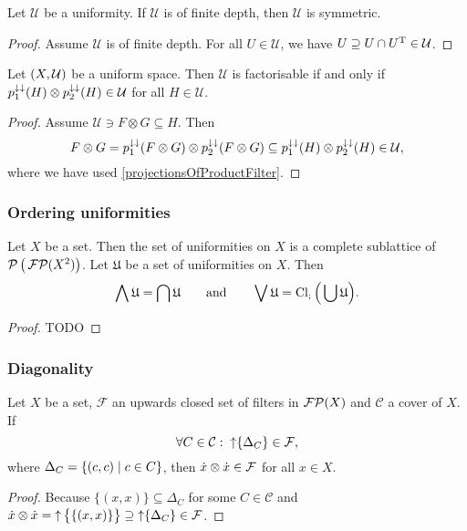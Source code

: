\begin{lemma}
Let $\mathcal{U}$ be a uniformity. If $\mathcal{U}$ is of finite depth, then $\mathcal{U}$ is symmetric.
\end{lemma}
\begin{proof}
Assume $\mathcal{U}$ is of finite depth. For all $U\in\mathcal{U}$, we have $U\supseteq U\cap U^{\mathrm{T}} \in \mathcal{U}$.
\end{proof}

\begin{lemma}
Let $\sSet{X,\mathcal{U}}$ be a uniform space. Then $\mathcal{U}$ is factorisable \textup{if and only if} $p_1^{\downarrow\downarrow}(H)\otimes p_2^{\downarrow\downarrow}(H) \in \mathcal{U}$ for all $H\in\mathcal{U}$.
\end{lemma}
\begin{proof}
Assume $\mathcal{U} \ni F\otimes G \subseteq H$. Then
\[ F\otimes G = p_1^{\downarrow\downarrow}(F\otimes G)\otimes p_2^{\downarrow\downarrow}(F\otimes G) \subseteq p_1^{\downarrow\downarrow}(H)\otimes p_2^{\downarrow\downarrow}(H) \in \mathcal{U}, \]
where we have used \ref{projectionsOfProductFilter}.
\end{proof}

\subsubsection{Ordering uniformities}
\begin{proposition} \label{latticeOfUniformities}
Let $X$ be a set. Then the set of uniformities on $X$ is a complete sublattice of $\operatorname{\mathcal{P}}\big(\operatorname{\mathcal{FP}}(X^2)\big)$. Let $\mathfrak{U}$ be a set of uniformities on $X$. Then
\[ \bigwedge\mathfrak{U} = \bigcap\mathfrak{U} \qquad\text{and}\qquad \bigvee\mathfrak{U} = \operatorname{Cl}_{;}\Big(\bigcup\mathfrak{U}\Big). \]
\end{proposition}
\begin{proof}
TODO
\end{proof}

\subsubsection{Diagonality}
\begin{lemma}
Let $X$ be a set, $\mathcal{F}$ an upwards closed set of filters in $\operatorname{\mathcal{FP}}(X)$ and $\mathcal{C}$ a cover of $X$. If
\[ \forall C\in\mathcal{C}: \; \operatorname{\uparrow}\{\Delta_C\} \in \mathcal{F}, \]
where $\Delta_C = \setbuilder{(c,c)}{c\in C}$, then $\dot{x}\otimes\dot{x}\in\mathcal{F}$ for all $x\in X$.
\end{lemma}
\begin{proof}
Because $\{(x,x)\}\subseteq \Delta_C$ for some $C\in\mathcal{C}$ and $\dot{x}\otimes\dot{x} = \operatorname{\uparrow} \big\{\{(x,x)\}\big\} \supseteq \operatorname{\uparrow}\{\Delta_C\} \in\mathcal{F}$.
\end{proof}

